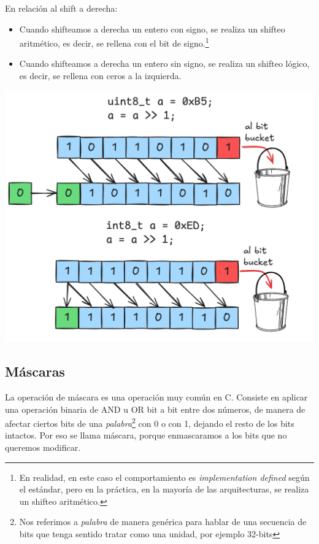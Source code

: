 \documentclass[]{scrartcl}
\begin{document}
En relación al shift a derecha:
\begin{itemize}
  \item Cuando shifteamos a derecha un entero con signo, se realiza un shifteo aritmético, es decir, se rellena con el bit de signo.\footnote{En realidad, en este caso el comportamiento es \textit{implementation defined} según el estándar, pero en la práctica, en la mayoría de las arquitecturas, se realiza un shifteo aritmético.}
  \item Cuando shifteamos a derecha un entero sin signo, se realiza un shifteo lógico, es decir, se rellena con ceros a la izquierda.
\end{itemize}

\begin{center}
  \includegraphics[scale=0.5]{./img/shift_right.png}  
  \label{fig:Shift_right}
\end{center}

\subsection*{Máscaras}

La operación de máscara es una operación muy común en C. Consiste en aplicar una operación binaria de AND u OR bit a bit entre dos números, de manera de afectar ciertos bits de una \textit{palabra}\footnote{Nos referimos a \textit{palabra} de manera genérica para hablar de una secuencia de bits que tenga sentido tratar como una unidad, por ejemplo 32-bits} con 0 o con 1, dejando el resto de los bits intactos. Por eso se llama máscara, porque enmascaramos a los bits que no queremos modificar.
\end{document}

